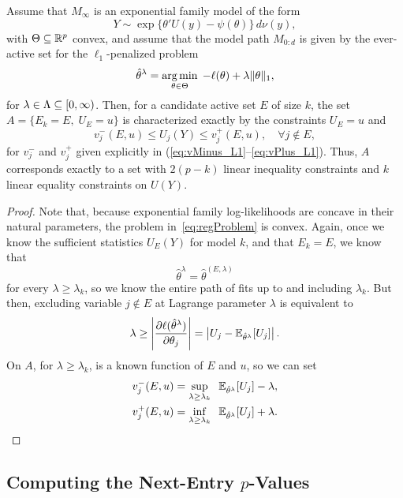 \documentclass{article}
\begin{document}
\begin{theorem}
  Assume that $M_\infty$ is an exponential family model
  of the form
  \[
  Y \sim \exp\{ \theta'U(y) - \psi(\theta) \}\,d\nu(y),
  \]
  with $\Theta \subseteq \mathbb{R}^p$ convex, and assume
  that the model path $M_{0:d}$ is given 
  by the ever-active set for the $\ell_1$-penalized problem
  \begin{equation}\label{eq:regProblem}
  \hat\theta^\lambda = \operatorname*{arg\,min}_{\theta\in \Theta} \;
  -\ell(\theta) + \lambda\|\theta\|_1,
  \end{equation}
  for $\lambda\in \Lambda \subseteq [0,\infty)$.
  Then, for a candidate active set $E$ of size $k$, 
  the set $A = \{E_k = E, \;U_E = u\}$ is characterized 
  exactly by the constraints $U_E = u$ and
  \[
  v_j^-(E,u) \leq U_j(Y) \leq v_j^+(E,u), \quad\forall j \notin E,
  \]
  for $v_j^-$ and $v_j^+$ given explicitly in
  (\ref{eq:vMinus_L1}--\ref{eq:vPlus_L1}).
  Thus, $A$ corresponds exactly to 
  a set with $2(p-k)$ linear inequality constraints and $k$
  linear equality constraints on $U(Y)$.
\end{theorem}

\begin{proof}
  Note that, because exponential family log-likelihoods are concave in their natural parameters, the problem in~\eqref{eq:regProblem} is convex. Again, once we know the sufficient statistics $U_E(Y)$ for model $k$, and that $E_k=E$, we know that
  \[
  \hat\theta^\lambda = \hat\theta^{(E,\lambda)}
  \]
  for every $\lambda \geq \lambda_k$, so we know the entire path of fits up to and including $\lambda_k$. But then, excluding variable $j \notin E$ at Lagrange parameter $\lambda$ is equivalent to
  \[
  \lambda \geq 
  \left| \frac{\partial \ell(\hat\theta^\lambda)}{\partial \theta_j} \right|
  = \left|U_j - \mathbb{E}_{\hat\theta^\lambda}[U_j]\right|.
  \]
  On $A$, for $\lambda \geq\lambda_k$, 
  \smash{$\E_{\hat\theta^\lambda}[U_j]$} is a known function of $E$ and $u$,
  so we can set
  \begin{align}\label{eq:vMinus_L1}
    v_j^-(E,u) &= \sup_{\lambda \geq \lambda_k} \;\; 
    \mathbb{E}_{\hat\theta^\lambda}[U_j] - \lambda, \\
    \label{eq:vPlus_L1}
    v_j^+(E,u) &= \inf_{\lambda \geq \lambda_k} \;\;
    \mathbb{E}_{\hat\theta^\lambda}[U_j] + \lambda.
  \end{align}
\end{proof}

\subsection{Computing the Next-Entry $p$-Values}\label{sec:next-entry-comp}
\end{document}
